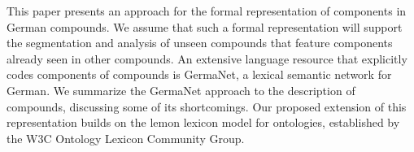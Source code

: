 This paper presents an approach for the formal representation of components in German compounds. We assume that such a formal representation will support the segmentation and analysis of unseen compounds that feature components already seen in other compounds. An extensive language resource that explicitly codes components of compounds is GermaNet, a lexical semantic network for German. We summarize the GermaNet approach to the description of compounds, discussing some of its shortcomings. Our proposed extension of this representation builds on the lemon lexicon model for ontologies, established by the W3C Ontology Lexicon Community Group.
